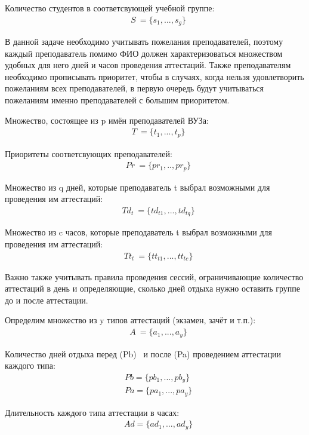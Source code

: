 Количество студентов в соответсвующей учебной группе: 
\begin{align}
	& S\ =  \{ s_1,...,s_g \} 
\end{align}

В данной задаче необходимо учитывать пожелания преподавателей, поэтому каждый преподаватель помимо ФИО должен характеризоваться множеством удобных для него дней и часов проведения аттестаций. Также преподавателям необходимо прописывать приоритет, чтобы в случаях, когда нельзя удовлетворить пожеланиям всех преподавателей, в первую очередь будут учитываться пожеланиям именно преподавателей с большим приоритетом.

Множество, состоящее из p имён преподавателей ВУЗа:
\begin{align}
	& T\ =  \{t_1,...,t_p \} 
\end{align}

Приоритеты соответсвующих преподавателей:
\begin{align}
	& Pr\ =  \{pr_1,..,pr_p \} 
\end{align}

Множество из q дней, которые преподаватель t выбрал возможными для проведения им аттестаций:
\begin{align}
& Td_t\ =  \{td_{t1},...,td_{tq} \} 
\end{align}

Множество из c часов, которые преподаватель t выбрал возможными для проведения им аттестаций:
\begin{align}
& Tt_t\ =  \{tt_{t1},...,tt_{tc} \} 
\end{align}

Важно также учитывать правила проведения сессий, ограничивающие количество аттестаций в день и определяющие, сколько дней отдыха нужно оставить группе до и после аттестации.

Определим множество из y типов аттестаций (экзамен, зачёт и т.п.):
\begin{align}
	& A\ =  \{a_1,...,a_y\} 
\end{align}

Количество дней отдыха перед (Pb)  и после (Pa) проведением аттестации каждого типа:
\begin{align}
	& Pb =  \{pb_1,...,pb_y\}\\ 
	& Pa =  \{pa_1,...,pa_y\} 
\end{align}

Длительность каждого типа аттестации в часах:
\begin{align}
	& Ad =  \{ad_1,...,ad_y\}
\end{align}

